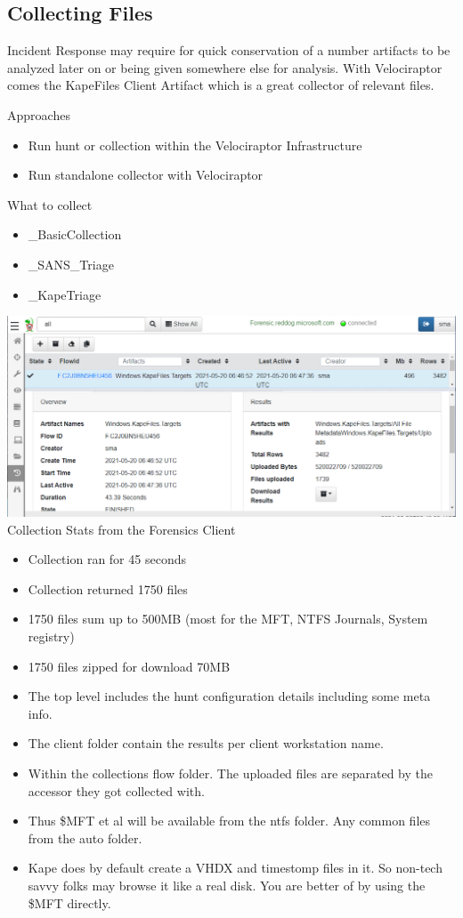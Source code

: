 \subsection{Collecting Files}
Incident Response may require for quick conservation of a number artifacts to be analyzed later on or being given somewhere else for analysis. With Velociraptor comes the KapeFiles Client Artifact which is a great collector of relevant files.

Approaches
\begin{itemize}
  \item Run hunt or collection within the Velociraptor Infrastructure
  \item Run standalone collector with Velociraptor
\end{itemize}

What to collect
\begin{itemize}
  \item \_BasicCollection
  \item \_SANS\_Triage
  \item \_KapeTriage
\end{itemize}

\includegraphics[width=\textwidth]{resources/06-collecting-files.png}
Collection Stats from the Forensics Client
\begin{itemize}
  \item Collection ran for 45 seconds
  \item Collection returned 1750 files
  \item 1750 files sum up to 500MB (most for the MFT, NTFS Journals, System registry)
  \item 1750 files zipped for download 70MB
  \item The top level includes the hunt configuration details including some meta info.
  \item The client folder contain the results per client workstation name.
  \item Within the collections flow folder. The uploaded files are separated by the accessor they got collected with.
  \item Thus \$MFT et al will be available from the ntfs folder. Any common files from the auto folder.
  \item Kape does by default create a VHDX and timestomp files in it. So non-tech savvy folks may browse it like a real disk. You are better of by using the \$MFT directly.
\end{itemize}

